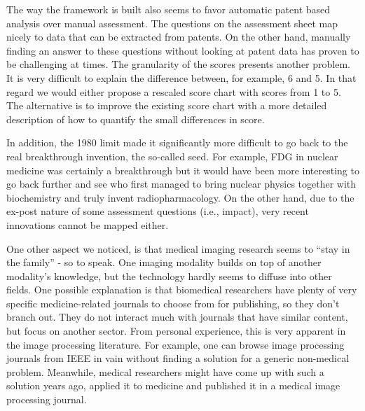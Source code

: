 The way the framework is built also seems to favor automatic patent based
analysis over manual assessment. The questions on the assessment sheet map
nicely to data that can be extracted from patents. On the other hand, manually
finding an answer to these questions without looking at patent data has proven
to be challenging at times. The granularity of the scores presents another
problem. It is very difficult to explain the difference between, for example, 6
and 5. In that regard we would either propose a rescaled score chart with scores
from 1 to 5. The alternative is to improve the existing score chart with a more
detailed description of how to quantify the small differences in score.

In addition, the 1980 limit made it significantly more difficult to go back to
the real breakthrough invention, the so-called seed. For example, FDG in nuclear
medicine was certainly a breakthrough but it would have been more interesting to
go back further and see who first managed to bring nuclear physics together with
biochemistry and truly invent radiopharmacology. On the other hand, due to the
ex-post nature of some assessment questions (i.e., impact), very recent
innovations cannot be mapped either.

One other aspect we noticed, is that medical imaging research seems to ``stay in
the family'' - so to speak. One imaging modality builds on top of another
modality's knowledge, but the technology hardly seems to diffuse into other
fields. One possible explanation is that biomedical researchers have plenty of
very specific medicine-related journals to choose from for publishing, so they
don't branch out. They do not interact much with journals that have similar
content, but focus on another sector. From personal experience, this is very
apparent in the image processing literature. For example, one can browse image
processing journals from IEEE in vain without finding a solution for a generic
non-medical problem. Meanwhile, medical researchers might have come up with such
a solution years ago, applied it to medicine and published it in a medical image
processing journal.


